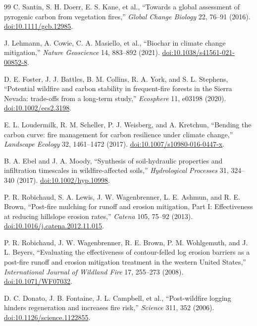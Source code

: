 \documentclass[10pt]{article}
\begin{document}
\begin{thebibliography}{99}
C. Santin, S. H. Doerr, E. S. Kane, et al., ``Towards a global assessment of
pyrogenic carbon from vegetation fires,'' \emph{Global Change Biology} 22,
76--91 (2016). \href{https://doi.org/10.1111/gcb.12985}{doi:10.1111/gcb.12985}.

J. Lehmann, A. Cowie, C. A. Masiello, et al., ``Biochar in climate change
mitigation,'' \emph{Nature Geoscience} 14, 883--892 (2021).
\href{https://doi.org/10.1038/s41561-021-00852-8}{doi:10.1038/s41561-021-00852-8}.

D. E. Foster, J. J. Battles, B. M. Collins, R. A. York, and S. L. Stephens,
``Potential wildfire and carbon stability in frequent-fire forests in the
Sierra Nevada: trade-offs from a long-term study,'' \emph{Ecosphere} 11,
e03198 (2020). \href{https://doi.org/10.1002/ecs2.3198}{doi:10.1002/ecs2.3198}.

E. L. Loudermilk, R. M. Scheller, P. J. Weisberg, and A. Kretchun, ``Bending
the carbon curve: fire management for carbon resilience under climate change,''
\emph{Landscape Ecology} 32, 1461--1472 (2017).
\href{https://doi.org/10.1007/s10980-016-0447-x}{doi:10.1007/s10980-016-0447-x}.

B. A. Ebel and J. A. Moody, ``Synthesis of soil-hydraulic properties and
infiltration timescales in wildfire-affected soils,'' \emph{Hydrological
Processes} 31, 324--340 (2017).
\href{https://doi.org/10.1002/hyp.10998}{doi:10.1002/hyp.10998}.

P. R. Robichaud, S. A. Lewis, J. W. Wagenbrenner, L. E. Ashmun, and R. E.
Brown, ``Post-fire mulching for runoff and erosion mitigation, Part I:
Effectiveness at reducing hillslope erosion rates,'' \emph{Catena} 105, 75--92
(2013). \href{https://doi.org/10.1016/j.catena.2012.11.015}{doi:10.1016/j.catena.2012.11.015}.

P. R. Robichaud, J. W. Wagenbrenner, R. E. Brown, P. M. Wohlgemuth, and J. L.
Beyers, ``Evaluating the effectiveness of contour-felled log erosion barriers
as a post-fire runoff and erosion mitigation treatment in the western United
States,'' \emph{International Journal of Wildland Fire} 17, 255--273 (2008).
\href{https://doi.org/10.1071/WF07032}{doi:10.1071/WF07032}.

D. C. Donato, J. B. Fontaine, J. L. Campbell, et al., ``Post-wildfire logging
hinders regeneration and increases fire risk,'' \emph{Science} 311, 352 (2006).
\href{https://doi.org/10.1126/science.1122855}{doi:10.1126/science.1122855}.


\end{thebibliography}
\end{document}
